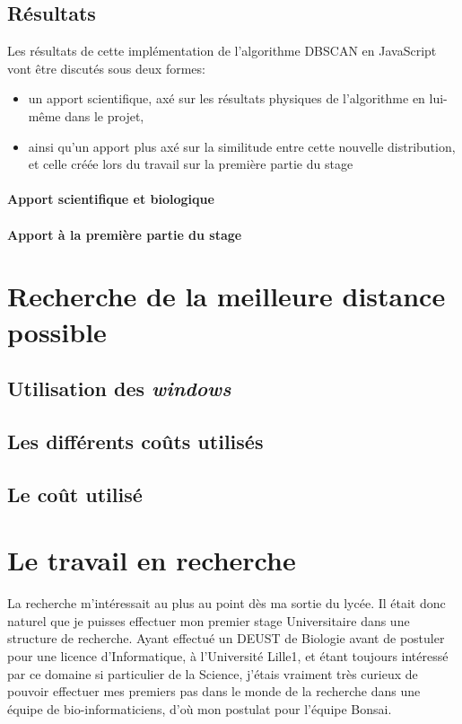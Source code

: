 \documentclass[12pt]{report}
\begin{document}
\begin{spacing}{1.2}
\section{Résultats}

Les résultats de cette implémentation de l'algorithme DBSCAN en JavaScript vont être discutés sous deux formes:
	\begin{itemize}
	\item{un apport scientifique, axé sur les résultats physiques de l'algorithme en lui-même dans le projet,}
	\item{ainsi qu'un apport plus axé sur la similitude entre cette nouvelle distribution, et celle créée lors du travail sur la première partie du stage}
	\end{itemize}

\subsubsection{Apport scientifique et biologique}

\subsubsection{Apport à la première partie du stage}

\chapter{Recherche de la meilleure distance possible}

\section{Utilisation des \textit{windows}}

\section{Les différents coûts utilisés}

\section{Le coût utilisé}

\chapter{Le travail en recherche}

La recherche m'intéressait au plus au point dès ma sortie du lycée.
\newline
Il était donc naturel que je puisses effectuer mon premier stage Universitaire dans une structure de recherche. Ayant effectué un DEUST de Biologie avant de postuler pour une licence d'Informatique, à l'Université Lille1, et étant toujours intéressé par ce domaine si particulier de la Science, j'étais vraiment très curieux de pouvoir effectuer mes premiers pas dans le monde de la recherche dans une équipe de bio-informaticiens, d'où mon postulat pour l'équipe Bonsai.


\end{spacing}
\end{document}
